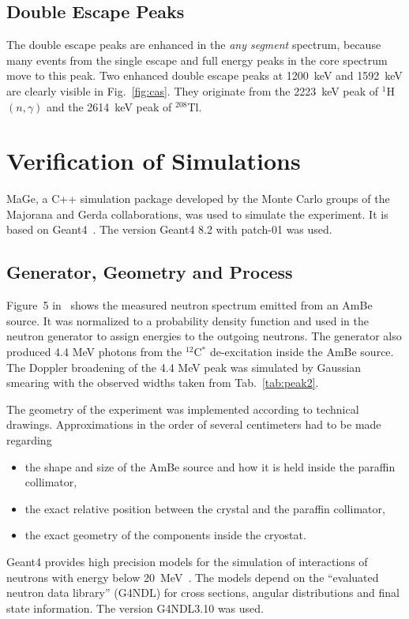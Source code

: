 \documentclass{elsart}
\begin{document}
\subsection{Double Escape Peaks}
\label{sec:dep}
The double escape peaks are enhanced in the \emph{any segment}
spectrum, because many events from the single escape and full energy
peaks in the core spectrum move to this peak. Two enhanced double
escape peaks at 1200~keV and 1592~keV are clearly visible in
Fig.~\ref{fig:cas}. They originate from the 2223~keV peak of
$^{1}$H$(n,\gamma)$ and the 2614~keV peak of $^{208}$Tl.

\section{Verification of Simulations}
\label{sec:sim}
MaGe, a C++ simulation package developed by the Monte Carlo groups of
the Majorana and Gerda collaborations, was used to simulate the
experiment. It is based on Geant4~\cite{g1,g2}. The version Geant4 8.2
with patch-01 was used.

\subsection{Generator, Geometry and Process}
\label{sec:simdetail}
Figure~5 in~\cite{amben} shows the measured neutron spectrum emitted
from an AmBe source. It was normalized to a probability density
function and used in the neutron generator to assign energies to the
outgoing neutrons. The generator also produced 4.4 MeV photons from
the $^{12}$C$^{*}$ de-excitation inside the AmBe source. The Doppler
broadening of the 4.4 MeV peak was simulated by Gaussian smearing with
the observed widths taken from Tab.~\ref{tab:peak2}.

The geometry of the experiment was implemented according to technical
drawings. Approximations in the order of several centimeters had to be
made regarding
\begin{itemize}
\item the shape and size of the AmBe source and how it is held inside
  the paraffin collimator,
\item the exact relative position between the crystal and the paraffin
  collimator,
\item the exact geometry of the components inside the cryostat.
\end{itemize}

Geant4 provides high precision models for the simulation of
interactions of neutrons with energy below 20~MeV~\cite{g1,g2}. The
models depend on the ``evaluated neutron data library'' (G4NDL) for
cross sections, angular distributions and final state information. The
version G4NDL3.10 was used.
\end{document}
